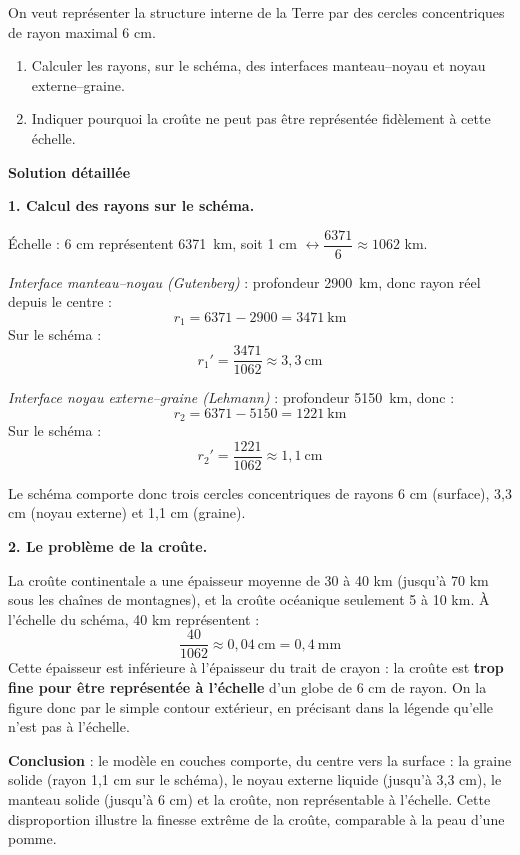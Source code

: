 \documentclass[11pt]{article}
\begin{document}
\begin{exoresolu}
On veut représenter la structure interne de la Terre par des cercles concentriques de rayon maximal 6 cm.
\begin{enumerate}
\item Calculer les rayons, sur le schéma, des interfaces manteau--noyau et noyau externe--graine.
\item Indiquer pourquoi la croûte ne peut pas être représentée fidèlement à cette échelle.
\end{enumerate}
\tcblower
\textbf{Solution détaillée}

\textbf{1. Calcul des rayons sur le schéma.}

Échelle : 6 cm représentent \SI{6371}{km}, soit 1 cm $\leftrightarrow \dfrac{6371}{6} \approx 1062$ km.

\textit{Interface manteau--noyau (Gutenberg)} : profondeur \SI{2900}{km}, donc rayon réel depuis le centre :
\[ r_1 = 6371 - 2900 = 3471~\text{km} \]
Sur le schéma :
\[ r_1' = \dfrac{3471}{1062} \approx 3{,}3~\text{cm} \]

\textit{Interface noyau externe--graine (Lehmann)} : profondeur \SI{5150}{km}, donc :
\[ r_2 = 6371 - 5150 = 1221~\text{km} \]
Sur le schéma :
\[ r_2' = \dfrac{1221}{1062} \approx 1{,}1~\text{cm} \]

Le schéma comporte donc trois cercles concentriques de rayons 6 cm (surface), 3,3 cm (noyau externe) et 1,1 cm (graine).

\textbf{2. Le problème de la croûte.}

La croûte continentale a une épaisseur moyenne de 30 à 40 km (jusqu'à 70 km sous les chaînes de montagnes), et la croûte océanique seulement 5 à 10 km. À l'échelle du schéma, 40 km représentent :
\[ \dfrac{40}{1062} \approx 0{,}04~\text{cm} = 0{,}4~\text{mm} \]
Cette épaisseur est inférieure à l'épaisseur du trait de crayon : la croûte est \textbf{trop fine pour être représentée à l'échelle} d'un globe de 6 cm de rayon. On la figure donc par le simple contour extérieur, en précisant dans la légende qu'elle n'est pas à l'échelle.

\textbf{Conclusion} : le modèle en couches comporte, du centre vers la surface : la graine solide (rayon 1,1 cm sur le schéma), le noyau externe liquide (jusqu'à 3,3 cm), le manteau solide (jusqu'à 6 cm) et la croûte, non représentable à l'échelle. Cette disproportion illustre la finesse extrême de la croûte, comparable à la peau d'une pomme.
\end{exoresolu}
\end{document}

